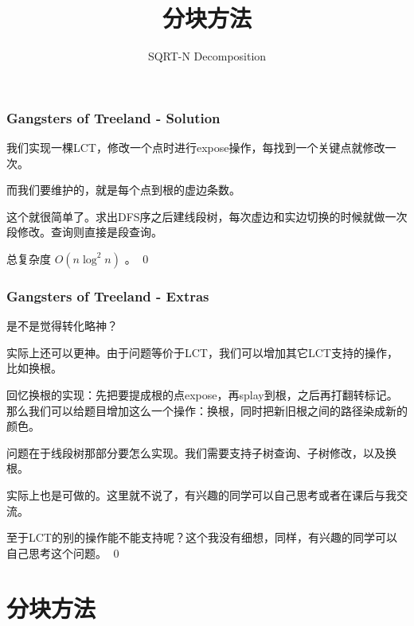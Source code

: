 \documentclass[9pt,dvipsnames,table]{beamer}
\newenvironment{qedframe}{%
	\begin{frame}[environment=qedqedframe]%
	}{%
	\qed
	\end{frame}%
}
\begin{document}
\begin{qedframe}
	\frametitle{Gangsters of Treeland - Solution}
	我们实现一棵LCT，修改一个点时进行expose操作，每找到一个关键点就修改一次。
	
	而我们要维护的，就是每个点到根的虚边条数。 \pause
	
	这个就很简单了。求出DFS序之后建线段树，每次虚边和实边切换的时候就做一次段修改。查询则直接是段查询。
	
	总复杂度 $ O(n\log^2n) $ 。
\end{qedframe}
\begin{qedframe}
	\frametitle{Gangsters of Treeland - Extras}
	是不是觉得转化略神？
	
	实际上还可以更神。由于问题等价于LCT，我们可以增加其它LCT支持的操作，比如换根。 \pause
	
	回忆换根的实现：先把要提成根的点expose，再splay到根，之后再打翻转标记。那么我们可以给题目增加这么一个操作：换根，同时把新旧根之间的路径染成新的颜色。 \pause
	
	问题在于线段树那部分要怎么实现。我们需要支持子树查询、子树修改，以及换根。 \pause
	
	实际上也是可做的。这里就不说了，有兴趣的同学可以自己思考或者在课后与我交流。 \pause
	
	至于LCT的别的操作能不能支持呢？这个我没有细想，同样，有兴趣的同学可以自己思考这个问题。
\end{qedframe}


\section[Part III]{分块方法}
\title[数据结构及其应用]{\fontsize{18pt}{\baselineskip}\textbf{分块方法}}
\subtitle[]{SQRT-N Decomposition}
\maketitle
\end{document}
